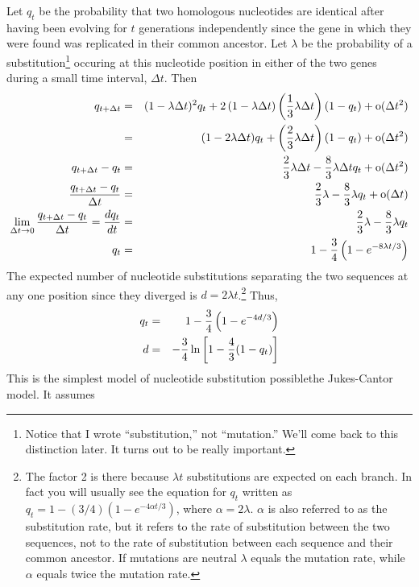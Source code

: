 Let $q_t$ be the probability that two homologous nucleotides are
identical after having been evolving for $t$ generations independently
since the gene in which they were found was replicated in their common
ancestor. Let $\lambda$ be the probability of a
substitution\footnote{Notice that I wrote ``substitution,'' not
  ``mutation.'' We'll come back to this distinction later. It turns
  out to be really important.} occuring
at this nucleotide position in either of the two genes during a small
time interval, $\Delta t$. Then
\begin{eqnarray*}
q_{t+\Delta t} &=& (1 - \lambda\Delta t)^2q_t
                  + 2\left(1 - \lambda\Delta t\right)\left({1 \over
                           3}\lambda\Delta t\right)(1 - q_t)
                  + \hbox{o}(\Delta t^2) \\
               &=& (1 - 2\lambda\Delta t)q_t + \left({2 \over 3}\lambda
                                                    \Delta t\right)
                                              (1 - q_t) 
                  + \hbox{o}(\Delta t^2) \\
q_{t+\Delta t} - q_t &=& {2 \over 3}\lambda\Delta t - {8 \over
                           3}\lambda\Delta tq_t + \hbox{o}(\Delta t^2) \\
{q_{t+\Delta t} - q_t \over \Delta t} &=& {2 \over 3}\lambda - {8 \over
3}\lambda q_t + \hbox{o}(\Delta t) \\
\lim_{\Delta t\to 0}{q_{t+\Delta t} - q_t \over \Delta t}  = {dq_t \over dt} &=& {2 \over 3}\lambda - {8
\over 3}\lambda q_t \\
q_t &=& 1 - {3 \over 4}\left(1 - e^{-8\lambda t/3}\right) \\
\end{eqnarray*}
The expected number of nucleotide substitutions separating the two
sequences at any one position since they diverged is $d = 2\lambda
t$.\footnote{The factor 2 is there because $\lambda t$ substitutions
  are expected on each branch. In fact you will usually see the
  equation for $q_t$ written as $q_t = 1 - (3/4)\left(1 - e^{-4\alpha
      t/3}\right)$, where $\alpha = 2\lambda$. $\alpha$ is also
  referred to as the substitution rate, but it refers to the rate of
  substitution between the two sequences, not to the rate of
  substitution between each sequence and their common ancestor. If
  mutations are neutral $\lambda$ equals the mutation rate, while
  $\alpha$ equals twice the mutation rate.} Thus,
\begin{eqnarray*}
q_t &=& 1 - {3 \over 4}\left(1 - e^{-4d/3}\right) \\
d   &=& -{3 \over 4}\ln\left[1 - {4 \over 3}(1 - q_t)\right] \\
\end{eqnarray*}
This is the simplest model of nucleotide substitution
possible{\dash}the Jukes-Cantor model. It assumes

